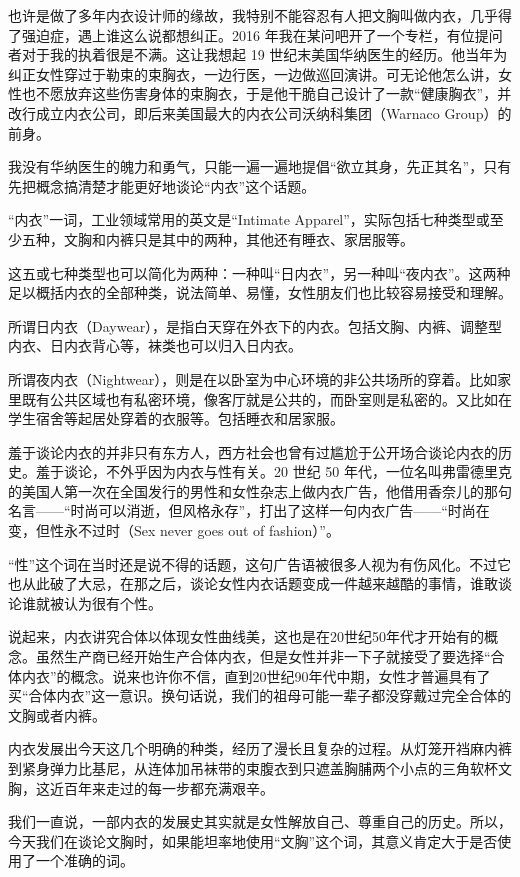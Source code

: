 \documentclass[12pt,UTF8]{ctexbook}
\begin{document}
也许是做了多年内衣设计师的缘故，我特别不能容忍有人把文胸叫做内衣，几乎得了强迫症，遇上谁这么说都想纠正。2016 年我在某问吧开了一个专栏，有位提问者对于我的执着很是不满。这让我想起 19 世纪末美国华纳医生的经历。他当年为纠正女性穿过于勒束的束胸衣，一边行医，一边做巡回演讲。可无论他怎么讲，女性也不愿放弃这些伤害身体的束胸衣，于是他干脆自己设计了一款“健康胸衣”，并改行成立内衣公司，即后来美国最大的内衣公司沃纳科集团（Warnaco Group）的前身。

我没有华纳医生的魄力和勇气，只能一遍一遍地提倡“欲立其身，先正其名”，只有先把概念搞清楚才能更好地谈论“内衣”这个话题。

“内衣”一词，工业领域常用的英文是“Intimate Apparel”，实际包括七种类型或至少五种，文胸和内裤只是其中的两种，其他还有睡衣、家居服等。

这五或七种类型也可以简化为两种：一种叫“日内衣”，另一种叫“夜内衣”。这两种足以概括内衣的全部种类，说法简单、易懂，女性朋友们也比较容易接受和理解。

所谓日内衣（Daywear），是指白天穿在外衣下的内衣。包括文胸、内裤、调整型内衣、日内衣背心等，袜类也可以归入日内衣。

所谓夜内衣（Nightwear），则是在以卧室为中心环境的非公共场所的穿着。比如家里既有公共区域也有私密环境，像客厅就是公共的，而卧室则是私密的。又比如在学生宿舍等起居处穿着的衣服等。包括睡衣和居家服。

羞于谈论内衣的并非只有东方人，西方社会也曾有过尴尬于公开场合谈论内衣的历史。羞于谈论，不外乎因为内衣与性有关。20 世纪 50 年代，一位名叫弗雷德里克的美国人第一次在全国发行的男性和女性杂志上做内衣广告，他借用香奈儿的那句名言——“时尚可以消逝，但风格永存”，打出了这样一句内衣广告——“时尚在变，但性永不过时（Sex never goes out of fashion）”。

“性”这个词在当时还是说不得的话题，这句广告语被很多人视为有伤风化。不过它也从此破了大忌，在那之后，谈论女性内衣话题变成一件越来越酷的事情，谁敢谈论谁就被认为很有个性。

说起来，内衣讲究合体以体现女性曲线美，这也是在20世纪50年代才开始有的概念。虽然生产商已经开始生产合体内衣，但是女性并非一下子就接受了要选择“合体内衣”的概念。说来也许你不信，直到20世纪90年代中期，女性才普遍具有了买“合体内衣”这一意识。换句话说，我们的祖母可能一辈子都没穿戴过完全合体的文胸或者内裤。

内衣发展出今天这几个明确的种类，经历了漫长且复杂的过程。从灯笼开裆麻内裤到紧身弹力比基尼，从连体加吊袜带的束腹衣到只遮盖胸脯两个小点的三角软杯文胸，这近百年来走过的每一步都充满艰辛。

我们一直说，一部内衣的发展史其实就是女性解放自己、尊重自己的历史。所以，今天我们在谈论文胸时，如果能坦率地使用“文胸”这个词，其意义肯定大于是否使用了一个准确的词。
\end{document}
